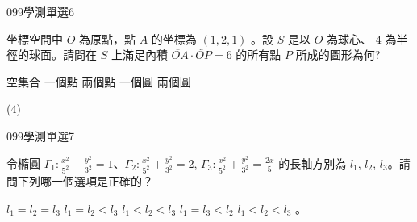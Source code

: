 \begin{QUESTIONS}
\begin{QUESTION}
\begin{QEMPTYSPACE}
        \end{QEMPTYSPACE}
    \end{QUESTION}
    \begin{QUESTION}
        \begin{ExamInfo}{099}{學測}{單選}{6}
        \end{ExamInfo}
        \begin{ExamAnsRateInfo}{49}{70}{53}{24}
        \end{ExamAnsRateInfo}
        \begin{QBODY}
			坐標空間中 $O$ 為原點，點 $A$ 的坐標為  $(1,2,1)$ 。設 $S$ 是以  $O$ 為球心、 $4$ 為半徑的球面。請問在 $S$ 上滿足內積 $\lvec{OA} \cdot \lvec{ OP} = 6$ 的所有點 $P$ 所成的圖形為何?
			\begin{QOPS} 
				\QOP 空集合 
				\QOP 一個點 
				\QOP 兩個點 
				\QOP 一個圓 
				\QOP 兩個圓 
			\end{QOPS}
        \end{QBODY}
        \begin{QFROMS}
        \end{QFROMS}
        \begin{QTAGS}\end{QTAGS}
        \begin{QANS}
            (4)
        \end{QANS}
        \begin{QSOLLIST}
        \end{QSOLLIST}
        \begin{QEMPTYSPACE}
        \end{QEMPTYSPACE}
    \end{QUESTION}
    \begin{QUESTION}
        \begin{ExamInfo}{099}{學測}{單選}{7}
        \end{ExamInfo}
        \begin{ExamAnsRateInfo}{33}{65}{22}{12}
        \end{ExamAnsRateInfo}
        \begin{QBODY}
			令橢圓 $\Gamma_1 : \frac{x^2}{5^2} + \frac{y^2}{3^2} =1$、$\Gamma_2 : \frac{x^2}{5^2} + \frac{y^2}{3^2} =2$, $\Gamma_3 : \frac{x^2}{5^2} + \frac{y^2}{3^2} =\frac{2x}{5}$ 的長軸方別為 $l_1$, $l_2$, $l_3$。請問下列哪一個選項是正確的？
			\begin{QOPS} 
				\QOP $l_1=l_2=l_3$ 
				\QOP $l_1=l_2<l_3$
				\QOP $l_1<l_2<l_3$ 
				\QOP $l_1=l_3<l_2$ 
				\QOP $l_1<l_2<l_3$ 。
			\end{QOPS}

\end{QBODY}
\end{QUESTION}
\end{QUESTIONS}
